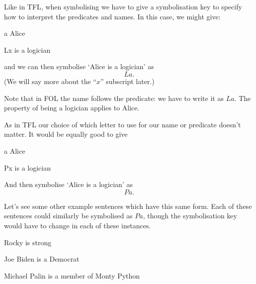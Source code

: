   
Like in TFL, when symbolising we have to give a symbolisation key to specify how to interpret the predicates and names. In this case, we might give:
\begin{ekey}
\item[a] Alice
\item[Lx]  is a logician
\end{ekey}
and we can then symbolise `Alice is a logician' as $$La.$$ (We will say more about the ``$x$'' subscript later.)

Note that in FOL the name follows the predicate: we have to write it as $La$. The property of being a logician applies to Alice. 

As in TFL our choice of which letter to use for our name or predicate doesn't matter. It would be equally good to give
\begin{ekey}
\item[a] Alice
\item[Px]  is a logician
\end{ekey}And then symbolise `Alice is a logician' as $$Pa.$$

Let's see some other example sentences which have this same form. Each of these sentences could similarly be symbolised as $Pa$, though the symbolisation key would have to change in each of these instances.
\begin{earg}
\item[\ex{folrocky}] Rocky is strong
\item[\ex{folbiden}] Joe Biden is a Democrat
\item[\ex{folpalin}] Michael Palin is a member of Monty Python
\end{earg}

